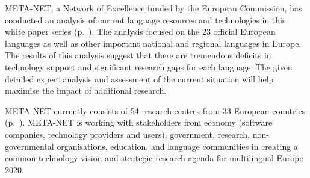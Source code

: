 \documentclass[]{../../metanetpaper}
\begin{document}
\begin{Parallel}[c]{78mm}{78mm}
{META-NET, a Network of Excellence funded by the European Commission, has conducted an  analysis of current language resources and technologies in this white paper series (p.~\pageref{whitepaperseries}). The analysis focused on the 23 official European languages as well as other important national and regional languages in Europe. The results of this analysis suggest that there are tremendous deficits in technology support and significant research gaps for each language. The given detailed expert analysis and assessment of the current situation will help maximise the impact of additional research.

META-NET currently consists of 54 research centres from 33 European countries (p.~\pageref{metanetmembers}). META-NET is working with stakeholders from economy (software companies, technology providers and users), government, research, non-governmental organisations, education, and language communities in  creating a common technology vision and strategic research agenda for multilingual Europe 2020.
 
}

\ParallelPar
\end{Parallel}

\cleardoublepage



\tableofcontents


\cleardoublepage


\setcounter{page}{1}
\pagestyle{scrheadings}



\end{document}
